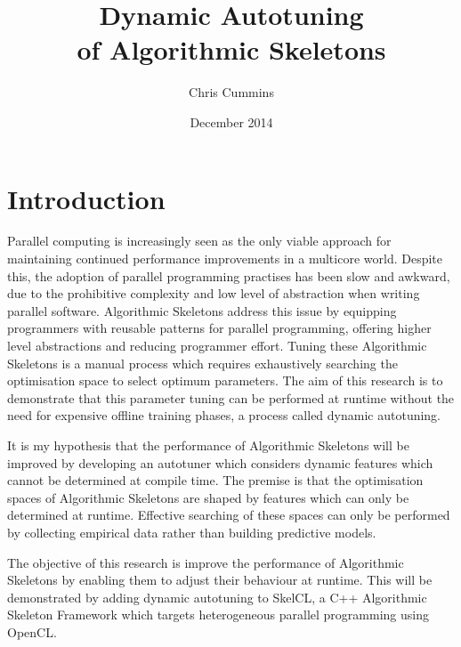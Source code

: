 
\author{Chris Cummins}

\date{December 2014}

\title{Dynamic Autotuning\\of Algorithmic Skeletons}

\newcommand{\subtitle}{MSc Research Proposal}

\newcommand{\degreeTitle}{MSc by Research\\ Pervasive Parallelism}

\newcommand{\institution}{School of Informatics,\\
  The University of Edinburgh}



\section{Introduction}

Parallel computing is increasingly seen as the only viable approach
for maintaining continued performance improvements in a multicore
world. Despite this, the adoption of parallel programming practises
has been slow and awkward, due to the prohibitive complexity and low
level of abstraction when writing parallel software. Algorithmic
Skeletons address this issue by equipping programmers with reusable
patterns for parallel programming, offering higher level abstractions
and reducing programmer effort. Tuning these Algorithmic Skeletons is
a manual process which requires exhaustively searching the
optimisation space to select optimum parameters. The aim of this
research is to demonstrate that this parameter tuning can be performed
at runtime without the need for expensive offline training phases, a
process called dynamic autotuning.

It is my hypothesis that the performance of Algorithmic Skeletons will
be improved by developing an autotuner which considers dynamic
features which cannot be determined at compile time. The premise is
that the optimisation spaces of Algorithmic Skeletons are shaped by
features which can only be determined at runtime. Effective searching
of these spaces can only be performed by collecting empirical data
rather than building predictive models.

The objective of this research is improve the performance of
Algorithmic Skeletons by enabling them to adjust their behaviour at
runtime. This will be demonstrated by adding dynamic autotuning to
SkelCL, a C++ Algorithmic Skeleton Framework which targets
heterogeneous parallel programming using OpenCL.

